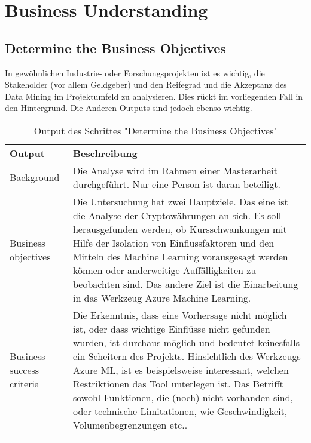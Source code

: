 \section{Business Understanding}
\subsection{Determine the Business Objectives}
In  gewöhnlichen Industrie- oder Forschungsprojekten ist es wichtig, die Stakeholder (vor allem Geldgeber) und den Reifegrad und die Akzeptanz des Data Mining im Projektumfeld zu analysieren. Dies rückt im vorliegenden Fall in den Hintergrund. Die Anderen Outputs sind jedoch ebenso wichtig.

\begin{longtable}[H]{|p{}|p{12cm}|}
\hline
\textbf{Output} & \textbf{Beschreibung} \\ 
\hhline{==}
Background & Die Analyse wird im Rahmen einer Masterarbeit durchgeführt. Nur eine Person ist daran beteiligt. \\
\hline
Business objectives & Die Untersuchung hat zwei Hauptziele. Das eine ist die Analyse der Cryptowährungen an sich. Es soll herausgefunden werden, ob Kursschwankungen mit Hilfe der Isolation von Einflussfaktoren und den Mitteln des Machine Learning vorausgesagt werden können oder anderweitige Auffälligkeiten zu beobachten sind. Das andere Ziel ist die Einarbeitung in das Werkzeug Azure Machine Learning. \\
\hline
Business success criteria & Die Erkenntnis, dass eine Vorhersage nicht möglich ist, oder dass wichtige Einflüsse nicht gefunden wurden, ist durchaus möglich und bedeutet keinesfalls ein Scheitern des Projekts. Hinsichtlich des Werkzeugs Azure ML, ist es beispielsweise interessant, welchen Restriktionen das Tool unterlegen ist. Das Betrifft sowohl Funktionen, die (noch) nicht vorhanden sind, oder technische Limitationen, wie Geschwindigkeit, Volumenbegrenzungen etc..\\
\hline
\caption{Output des Schrittes "Determine the Business Objectives"}
\end{longtable}

